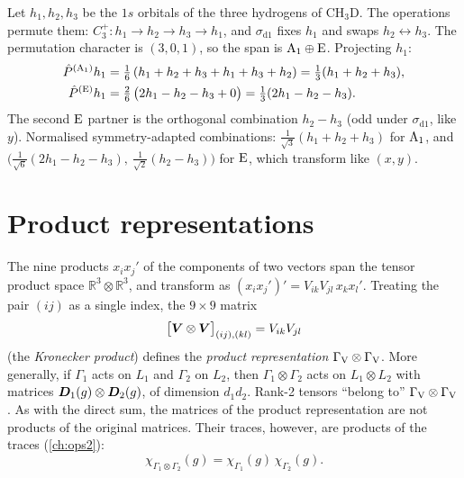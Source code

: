 \begin{example}
Let $h_1,h_2,h_3$ be the $1s$ orbitals of the three hydrogens of $\mathrm{CH_3D}$. The
operations permute them: $C_3^+\colon h_1\to h_2\to h_3\to h_1$, and
$\sigma_{\mathrm{d}1}$ fixes $h_1$ and swaps $h_2\leftrightarrow h_3$. The permutation
character is $(3,0,1)$, so the span is $\mathrm{A}_1\oplus\mathrm{E}$. Projecting $h_1$:
\begin{align*}
\hat{P}^{(\mathrm{A}_1)}h_1&=\tfrac16\,(h_1+h_2+h_3+h_1+h_3+h_2)
    =\tfrac13(h_1+h_2+h_3),\\
\hat{P}^{(\mathrm{E})}h_1&=\tfrac26\,\bigl(2h_1-h_2-h_3+0\bigr)
    =\tfrac13(2h_1-h_2-h_3).
\end{align*}
The second $\mathrm{E}$ partner is the orthogonal combination $h_2-h_3$ (odd under
$\sigma_{\mathrm{d}1}$, like $y$). Normalised symmetry-adapted combinations:
$\tfrac{1}{\sqrt3}(h_1+h_2+h_3)$ for $\mathrm{A}_1$, and
$\bigl(\tfrac{1}{\sqrt6}(2h_1-h_2-h_3),\ \tfrac{1}{\sqrt2}(h_2-h_3)\bigr)$ for
$\mathrm{E}$, which transform like $(x,y)$.
\end{example}

\section{Product representations}\label{sec:product}

The nine products $x_ix_j'$ of the components of two vectors span the tensor product
space $\mathbb{R}^3\otimes\mathbb{R}^3$, and transform as
$(x_ix_j')'=V_{ik}V_{jl}\,x_kx_l'$. Treating the pair $(ij)$ as a single index, the
$9\times9$ matrix
\begin{equation}
  \bigl[\bm{V}\otimes\bm{V}\bigr]_{(ij),(kl)}=V_{ik}V_{jl}
\end{equation}
(the \emph{Kronecker product}) defines the \emph{product representation}
$\Gamma_{\mathrm{V}}\otimes\Gamma_{\mathrm{V}}$. More generally, if $\Gamma_1$ acts on $L_1$ and $\Gamma_2$ on
$L_2$, then $\Gamma_1\otimes\Gamma_2$ acts on $L_1\otimes L_2$ with matrices
$\bm{D}_1(g)\otimes\bm{D}_2(g)$, of dimension $d_1d_2$. Rank-2 tensors
``belong to'' $\Gamma_{\mathrm{V}}\otimes\Gamma_{\mathrm{V}}$. As with the direct sum, the matrices of the product
representation are not products of the original matrices. Their traces, however,
are products of the traces (\cref{ch:ops2}):
\begin{equation}\label{eq:prodchar}
  \chi_{\Gamma_1\otimes\Gamma_2}(g)=\chi_{\Gamma_1}(g)\,\chi_{\Gamma_2}(g).
\end{equation}

